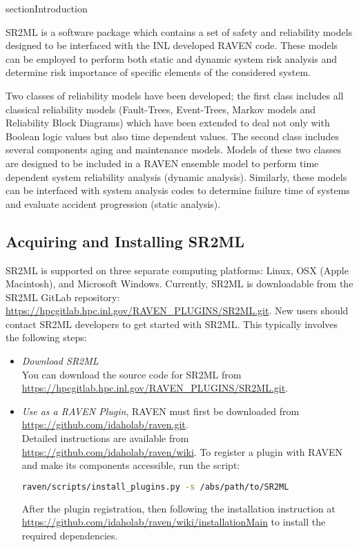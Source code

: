 section{Introduction}
\label{sec:Introduction}

SR2ML is a software package which contains a set of safety and reliability models
designed to be interfaced with the INL developed RAVEN code. These models can be
employed to perform both static and dynamic system risk analysis and determine
risk importance of specific elements of the considered system.

Two classes of reliability models have been developed; the first class includes
all classical reliability models (Fault-Trees, Event-Trees, Markov models and
Reliability Block Diagrams) which have been extended to deal not only with
Boolean logic values but also time dependent values. The second class includes
several components aging and maintenance models. Models of these two classes are designed to
be included in a RAVEN ensemble model to perform time dependent system reliability
analysis (dynamic analysis). Similarly, these models can be interfaced with system
analysis codes  to determine failure time of systems and evaluate accident progression
(static analysis).

\subsection{Acquiring and Installing SR2ML}
SR2ML is supported on three separate computing platforms: Linux, OSX (Apple Macintosh), and Microsoft
Windows. Currently, SR2ML is downloadable from the SR2ML GitLab repository:
\url{https://hpcgitlab.hpc.inl.gov/RAVEN_PLUGINS/SR2ML.git}. New users should contact SR2ML developers to
get started with SR2ML. This typically involves the following steps:

\begin{itemize}
  \item \textit{Download SR2ML}
    \\ You can download the source code for SR2ML from \url{https://hpcgitlab.hpc.inl.gov/RAVEN_PLUGINS/SR2ML.git}.
	\item \textit{Use as a RAVEN Plugin}, RAVEN must first be downloaded from
  \url{https://github.com/idaholab/raven.git}.
		\\ Detailed instructions are available from \url{https://github.com/idaholab/raven/wiki}.
    To register a plugin with RAVEN and make its components accessible, run the script:
    \begin{lstlisting}[language=bash]
  	raven/scripts/install_plugins.py -s /abs/path/to/SR2ML
  	\end{lstlisting}
    After the plugin registration, then following the installation instruction at
    \url{https://github.com/idaholab/raven/wiki/installationMain} to install the
    required dependencies.
\end{itemize}


